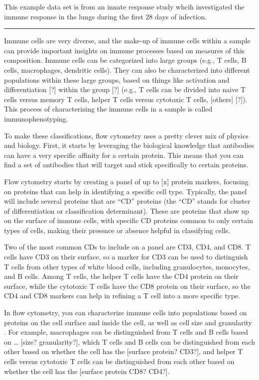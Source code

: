 \documentclass[
]{book}
\begin{document}
This example data set is from an innate response study whcih investigated the immune response in the lungs during the first 28 days of infection.

\begin{center}\rule{0.5\linewidth}{0.5pt}\end{center}

Immune cells are very diverse, and the make-up of immune cells within a sample
can provide important insights on immune processes based on measures of this
composition. Immune cells can be categorized into large groups (e.g., T cells, B
cells, macrophages, dendritic cells). They can also be characterized into
different populations within these large groups, based on things like activation
and differentiation {[}?{]} within the group {[}?{]} \citep{maecker2012standardizing} (e.g.,
T cells can be divided into naive T cells versus memory T cells, helper T cells
versus cytotoxic T cells, {[}others{]} {[}?{]}). This process of characterizing the
immune cells in a sample is called immunophenotyping.

To make these classifications, flow cytometry uses a pretty clever mix of
physics and biology. First, it starts by leveraging the biological knowledge
that antibodies can have a very specific affinity for a certain protein.
This means that you can find a set of antibodies that will target and
stick specifically to certain proteins.

Flow cytometry starts by creating a panel of up to {[}x{]} protein markers, focusing
on proteins that can help in identifying a specific cell type. Typically, the
panel will include several proteins that are ``CD'' proteins (the ``CD'' stands for
cluster of differentiation or classification determinant). These are proteins
that show up on the surface of immune cells, with specific CD proteins common
to only certain types of cells, making their presence or absence helpful in
classifying cells.

Two of the most common CDs to include on a panel are CD3, CD4, and CD8. T cells have
CD3 on their surface, so a marker for CD3 can be used to distinguish T cells
from other types of white blood cells, including granulocytes, monocytes, and
B cells. Among T cells, the helper T cells have the CD4 protein on their surface,
while the cytotoxic T cells have the CD8 protein on their surface, so the CD4
and CD8 markers can help in refining a T cell into a more specific type.

In flow cytometry, you can characterize immune cells into populations based on
proteins on the cell surface and inside the cell, as well as cell size and
granularity \citep[\citet{barnett2008cd4}]{maecker2012standardizing}. For example,
macrophages can be distinguished from T cells and B cells based on \ldots{} {[}size?
granularity?{]}, which T cells and B cells can be distinguished from each other
based on whether the cell has the {[}surface protein? CD3?{]}, and helper T cells
versus cytotoxic T cells can be distinguished from each other based on whether
the cell has the {[}surface protein CD8? CD4?{]}.
\end{document}
